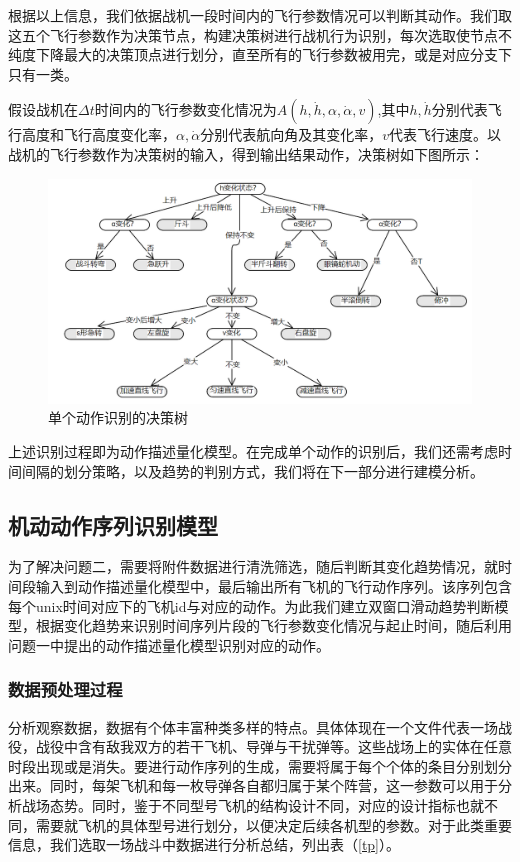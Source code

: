 \documentclass{my_paper}
\begin{document}
根据以上信息，我们依据战机一段时间内的飞行参数情况可以判断其动作。我们取这五个飞行参数作为决策节点，构建决策树进行战机行为识别，每次选取使节点不纯度下降最大的决策顶点进行划分，直至所有的飞行参数被用完，或是对应分支下只有一类。

假设战机在$\Delta t$时间内的飞行参数变化情况为$A(h,\dot{h},\alpha,\dot{\alpha},v )$,其中$h,\dot{h}$分别代表飞行高度和飞行高度变化率，$\alpha,\dot{\alpha}$分别代表航向角及其变化率，$v$代表飞行速度。以战机的飞行参数作为决策树的输入，得到输出结果动作，决策树如下图所示：

\begin {figure}[h]
\centering %
\includegraphics[width=\textwidth]{juece.png}
\caption{单个动作识别的决策树} %
\label{five}
\end {figure}

上述识别过程即为动作描述量化模型。在完成单个动作的识别后，我们还需考虑时间间隔的划分策略，以及趋势的判别方式，我们将在下一部分进行建模分析。

\subsection{机动动作序列识别模型}

为了解决问题二，需要将附件数据进行清洗筛选，随后判断其变化趋势情况，就时间段输入到动作描述量化模型中，最后输出所有飞机的飞行动作序列。该序列包含每个unix时间对应下的飞机id与对应的动作。为此我们建立双窗口滑动趋势判断模型，根据变化趋势来识别时间序列片段的飞行参数变化情况与起止时间，随后利用问题一中提出的动作描述量化模型识别对应的动作。

\subsubsection{数据预处理过程}

分析观察数据，数据有个体丰富种类多样的特点。具体体现在一个文件代表一场战役，战役中含有敌我双方的若干飞机、导弹与干扰弹等。这些战场上的实体在任意时段出现或是消失。要进行动作序列的生成，需要将属于每个个体的条目分别划分出来。同时，每架飞机和每一枚导弹各自都归属于某个阵营，这一参数可以用于分析战场态势。同时，鉴于不同型号飞机的结构设计不同，对应的设计指标也就不同，需要就飞机的具体型号进行划分，以便决定后续各机型的参数。对于此类重要信息，我们选取一场战斗中数据进行分析总结，列出表（\ref{tp}）。
\end{document}
